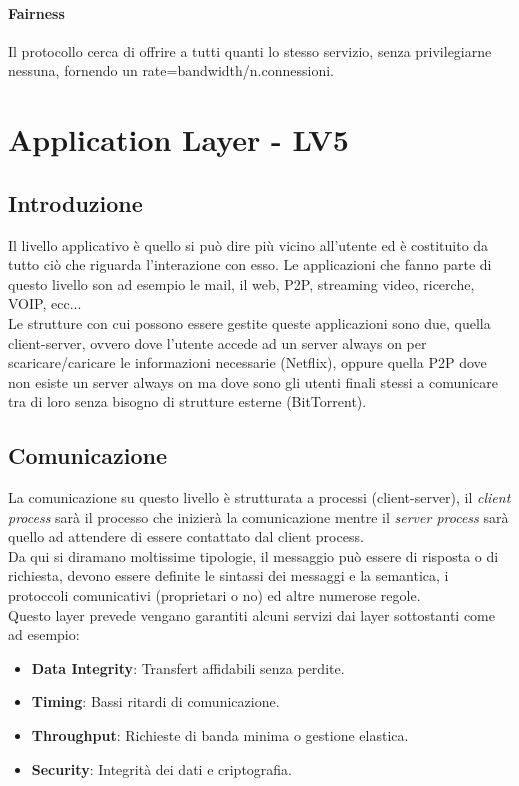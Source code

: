 \documentclass[12pt]{article}
\begin{document}
\paragraph{Fairness} Il protocollo cerca di offrire a tutti quanti lo stesso servizio, senza privilegiarne nessuna, fornendo un rate=bandwidth/n.connessioni.


\section{Application Layer - LV5} \label{LV5} %
\subsection{Introduzione}
Il livello applicativo è quello si può dire più vicino all'utente ed è costituito da tutto ciò che riguarda l'interazione con esso. Le applicazioni che fanno parte di questo livello son ad esempio le mail, il web, P2P, streaming video, ricerche, VOIP, ecc...\\
Le strutture con cui possono essere gestite queste applicazioni sono due, quella client-server, ovvero dove l'utente accede ad un server always on per scaricare/caricare le informazioni necessarie (Netflix), oppure quella P2P dove non esiste un server always on ma dove sono gli utenti finali stessi a comunicare tra di loro senza bisogno di strutture esterne (BitTorrent).

\subsection{Comunicazione}
La comunicazione su questo livello è strutturata a processi (client-server), il \textit{client process} sarà il processo che inizierà la comunicazione mentre il \textit{server process} sarà quello ad attendere di essere contattato dal client process.\\
Da qui si diramano moltissime tipologie, il messaggio può essere di risposta o di richiesta, devono essere definite le sintassi dei messaggi e la semantica, i protoccoli comunicativi (proprietari o no) ed altre numerose regole.\\
Questo layer prevede vengano garantiti alcuni servizi dai layer sottostanti come ad esempio:
\begin{itemize}
  \item \textbf{Data Integrity}: Transfert affidabili senza perdite.
  \item \textbf{Timing}: Bassi ritardi di comunicazione.
  \item \textbf{Throughput}: Richieste di banda minima o gestione elastica.
  \item \textbf{Security}: Integrità dei dati e criptografia.
\end{itemize}
\end{document}
